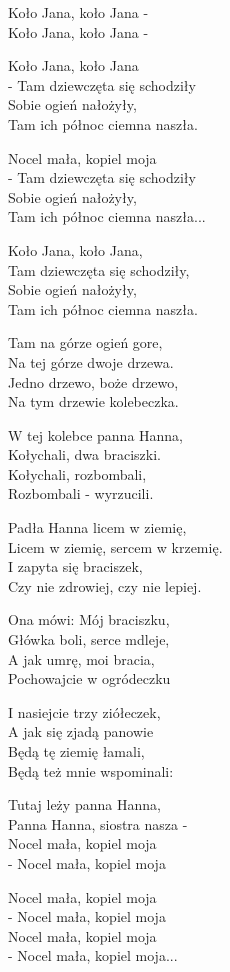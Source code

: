 \begin{text}
    \begin{footTwelve}
    Koło Jana, koło Jana -\\
    Koło Jana, koło Jana -

    Koło Jana, koło Jana\\
    - Tam dziewczęta się schodziły\\
    Sobie ogień nałożyły,\\
    Tam ich północ ciemna naszła.

    Nocel mała, kopiel moja\\
    - Tam dziewczęta się schodziły\\
    Sobie ogień nałożyły,\\
    Tam ich północ ciemna naszła...

    Koło Jana, koło Jana,\\
    Tam dziewczęta się schodziły,\\
    Sobie ogień nałożyły,\\
    Tam ich północ ciemna naszła.

    Tam na górze ogień gore,\\
    Na tej górze dwoje drzewa.\\
    Jedno drzewo, boże drzewo,\\
    Na tym drzewie kolebeczka.

    W tej kolebce panna Hanna,\\
    Kołychali, dwa braciszki.\\
    Kołychali, rozbombali,\\
    Rozbombali - wyrzucili.

    Padła Hanna licem w ziemię,\\
    Licem w ziemię, sercem w krzemię.\\
    I zapyta się braciszek,\\
    Czy nie zdrowiej, czy nie lepiej.

    Ona mówi: Mój braciszku,\\
    Główka boli, serce mdleje,\\
    A jak umrę, moi bracia,\\
    Pochowajcie w ogródeczku

    I nasiejcie trzy ziółeczek,\\
    A jak się zjadą panowie\\
    Będą tę ziemię łamali,\\
    Będą też mnie wspominali:

    Tutaj leży panna Hanna,\\
    Panna Hanna, siostra nasza -\\
    Nocel mała, kopiel moja\\
    - Nocel mała, kopiel moja

    Nocel mała, kopiel moja\\
    - Nocel mała, kopiel moja\\
    Nocel mała, kopiel moja\\
    - Nocel mała, kopiel moja...
\end{footTwelve}
\end{text}
